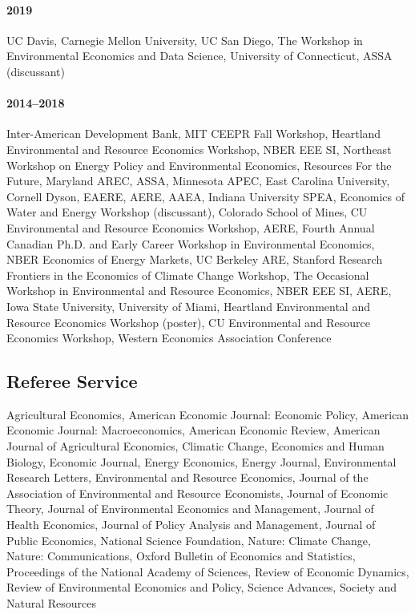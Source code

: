 \documentclass[12pt]{res} %
\begin{document}
\begin{resume}
\paragraph{2019} UC Davis, Carnegie Mellon University, UC San Diego, The Workshop in Environmental Economics and Data Science, University of Connecticut, ASSA (discussant) \vspace{-.2in}
\paragraph{2014--2018} Inter-American Development Bank, MIT CEEPR Fall Workshop, Heartland Environmental and Resource Economics Workshop, NBER EEE SI, Northeast Workshop on Energy Policy and Environmental Economics, Resources For the Future, Maryland AREC, ASSA, Minnesota APEC, East Carolina University, Cornell Dyson, EAERE, AERE, AAEA, Indiana University SPEA, Economics of Water and Energy Workshop (discussant), Colorado School of Mines, CU Environmental and Resource Economics Workshop, AERE, Fourth Annual Canadian Ph.D. and Early Career Workshop in Environmental Economics, NBER Economics of Energy Markets, UC Berkeley ARE, Stanford Research Frontiers in the Economics of Climate Change Workshop, The Occasional Workshop in Environmental and Resource Economics, NBER EEE SI, AERE, Iowa State University, University of Miami, Heartland Environmental and Resource Economics Workshop (poster), CU Environmental and Resource Economics Workshop, Western Economics Association Conference

\vspace{-.2in}

\subsection{Referee Service}\vspace{-.2in}
	Agricultural Economics,
	American Economic Journal: Economic Policy,
	American Economic Journal: Macroeconomics,
	American Economic Review,
	American Journal of Agricultural Economics,
	Climatic Change,
	Economics and Human Biology,
	Economic Journal,
	Energy Economics,
	Energy Journal,
	Environmental Research Letters,
	Environmental and Resource Economics,
	Journal of the Association of Environmental and Resource Economists,
	Journal of Economic Theory,
	Journal of Environmental Economics and Management,
	Journal of Health Economics,
	Journal of Policy Analysis and Management,
	Journal of Public Economics,
	National Science Foundation,
	Nature: Climate Change,
	Nature: Communications,
	Oxford Bulletin of Economics and Statistics,
	Proceedings of the National Academy of Sciences,
	Review of Economic Dynamics,
	Review of Environmental Economics and Policy,
	Science Advances,
	Society and Natural Resources


\end{resume}
\end{document}
